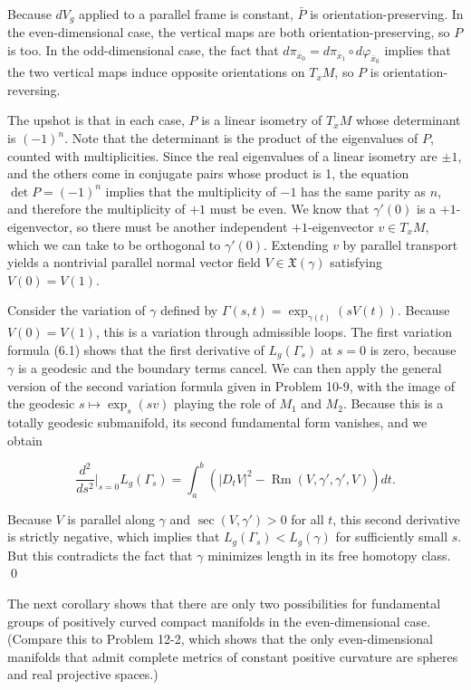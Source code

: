 \begin{theorem}[Synge]
Because $d V_g$ applied to a parallel frame is constant, $\bar{P}$ is orientation-preserving. In the even-dimensional case, the vertical maps are both orientation-preserving, so $P$ is too. In the odd-dimensional case, the fact that $d\pi_{\bar{x}_0} = d\pi_{\bar{x}_1} \circ d\varphi_{\bar{x}_0}$ implies that the two vertical maps induce opposite orientations on $T_x M$, so $P$ is orientation-reversing.

The upshot is that in each case, $P$ is a linear isometry of $T_x M$ whose determinant is $(-1)^n$. Note that the determinant is the product of the eigenvalues of $P$, counted with multiplicities. Since the real eigenvalues of a linear isometry are $\pm 1$, and the others come in conjugate pairs whose product is 1, the equation $\det P = (-1)^n$ implies that the multiplicity of $-1$ has the same parity as $n$, and therefore the multiplicity of $+1$ must be even. We know that $\gamma'(0)$ is a $+1$-eigenvector, so there must be another independent $+1$-eigenvector $v \in T_x M$, which we can take to be orthogonal to $\gamma'(0)$. Extending $v$ by parallel transport yields a nontrivial parallel normal vector field $V \in \mathfrak{X}(\gamma)$ satisfying $V(0) = V(1)$.

Consider the variation of $\gamma$ defined by $\Gamma(s,t) = \exp_{\gamma(t)}(sV(t))$. Because $V(0) = V(1)$, this is a variation through admissible loops. The first variation formula (6.1) shows that the first derivative of $L_g(\Gamma_s)$ at $s = 0$ is zero, because $\gamma$ is a geodesic and the boundary terms cancel. We can then apply the general version of the second variation formula given in Problem 10-9, with the image of the geodesic $s \mapsto \exp_s(sv)$ playing the role of $M_1$ and $M_2$. Because this is a totally geodesic submanifold, its second fundamental form vanishes, and we obtain

\[
\frac{d^2}{ds^2}\bigg|_{s=0} L_g(\Gamma_s) = \int_a^b \left(|D_t V|^2 - \operatorname{Rm}(V, \gamma', \gamma', V)\right) dt.
\]

Because $V$ is parallel along $\gamma$ and $\sec(V,\gamma') > 0$ for all $t$, this second derivative is strictly negative, which implies that $L_g(\Gamma_s) < L_g(\gamma)$ for sufficiently small $s$. But this contradicts the fact that $\gamma$ minimizes length in its free homotopy class. \qed
\end{theorem}

The next corollary shows that there are only two possibilities for fundamental groups of positively curved compact manifolds in the even-dimensional case. (Compare this to Problem 12-2, which shows that the only even-dimensional manifolds that admit complete metrics of constant positive curvature are spheres and real projective spaces.)

